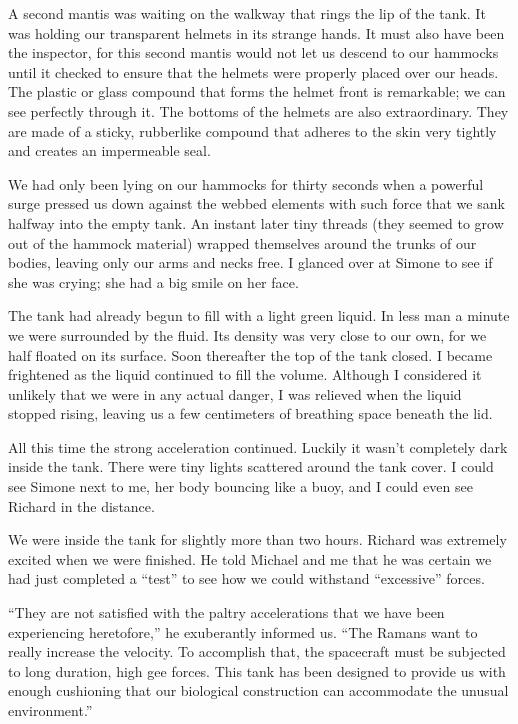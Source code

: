 \documentclass[]{article}
\begin{document}
A second mantis was waiting on the walkway that rings the lip of the tank. It was holding our transparent helmets in its strange hands. It must also have been the inspector, for this second mantis would not let us descend to our hammocks until it checked to ensure that the helmets were properly placed over our heads. The plastic or glass compound that forms the helmet front is remarkable; we can see perfectly through it. The bottoms of the helmets are also extraordinary. They are made of a sticky, rubberlike compound that adheres to the skin very tightly and creates an impermeable seal.

We had only been lying on our hammocks for thirty seconds when a powerful surge pressed us down against the webbed elements with such force that we sank halfway into the empty tank. An instant later tiny threads (they seemed to grow out of the hammock material) wrapped themselves around the trunks of our bodies, leaving only our arms and necks free. I glanced over at Simone to see if she was crying; she had a big smile on her face.

The tank had already begun to fill with a light green liquid. In less man a minute we were surrounded by the fluid. Its density was very close to our own, for we half floated on its surface. Soon thereafter the top of the tank closed. I became frightened as the liquid continued to fill the volume. Although I considered it unlikely that we were in any actual danger, I was relieved when the liquid stopped rising, leaving us a few centimeters of breathing space beneath the lid.

All this time the strong acceleration continued. Luckily it wasn’t completely dark inside the tank. There were tiny lights scattered around the tank cover. I could see Simone next to me, her body bouncing like a buoy, and I could even see Richard in the distance.

We were inside the tank for slightly more than two hours. Richard was extremely excited when we were finished. He told Michael and me that he was certain we had just completed a “test” to see how we could withstand “excessive” forces.

“They are not satisfied with the paltry accelerations that we have been experiencing heretofore,” he exuberantly informed us. “The Ramans want to really increase the velocity. To accomplish that, the spacecraft must be subjected to long duration, high gee forces. This tank has been designed to provide us with enough cushioning that our biological construction can accommodate the unusual environment.”
\end{document}
